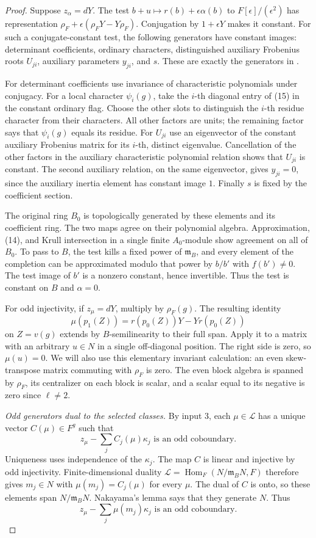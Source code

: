 \begin{proof}
Suppose $z_\alpha=dY$.  The test
$b+u\mapsto r(b)+\epsilon\alpha(b)$ to $F[\epsilon]/(\epsilon^2)$
has representation
$\rho_F+\epsilon(\rho_FY-Y\rho_F)$.
Conjugation by $1+\epsilon Y$ makes it constant.
For such a conjugate-constant test, the following generators
have constant images: determinant coefficients, ordinary
characters, distinguished auxiliary Frobenius roots $U_{ji}$,
auxiliary parameters $y_{ji}$, and $s$.
These are exactly the generators in .

For determinant coefficients use invariance of characteristic
polynomials under conjugacy.
For a local character $\psi_i(g)$, take the $i$-th diagonal
entry of (15) in the constant ordinary flag.
Choose the other slots to distinguish the $i$-th residue
character from their characters.  All other factors are units;
the remaining factor says that $\psi_i(g)$ equals its residue.
For $U_{ji}$ use an eigenvector of the constant auxiliary
Frobenius matrix for its $i$-th, distinct eigenvalue.
Cancellation of the other factors in the auxiliary
characteristic polynomial relation shows that $U_{ji}$ is
constant.  The second auxiliary relation, on the same
eigenvector, gives $y_{ji}=0$, since the auxiliary inertia
element has constant image $1$.
Finally $s$ is fixed by the coefficient section.

The original ring $B_0$ is topologically generated by these
elements and its coefficient ring.  The two maps agree on
their polynomial algebra.  Approximation, (14), and Krull
intersection in a single finite $A_0$-module show agreement on
all of $B_0$.
To pass to $B$, the test kills a fixed power of
$\mathfrak m_B$, and every element of the completion can be
approximated modulo that power by $b/b'$ with $f(b')\ne0$.
The test image of $b'$ is a nonzero constant, hence invertible.
Thus the test is constant on $B$ and $\alpha=0$.

For odd injectivity, if $z_\mu=dY$, multiply by $\rho_F(g)$.
The resulting identity
\[
 \mu(p_1(Z))=r(p_0(Z))Y-Yr(p_0(Z))
\]
on $Z=v(g)$ extends by $B$-semilinearity to their full span.
Apply it to a matrix with an arbitrary $u\in N$ in a single
off-diagonal position.  The right side is zero, so $\mu(u)=0$.
We will also use this elementary invariant calculation:
an even skew-transpose matrix commuting with $\rho_F$ is zero.
The even block algebra is spanned by $\rho_F$, its centralizer
on each block is scalar, and a scalar equal to its negative
is zero since $\ell\ne2$.

\emph{Odd generators dual to the selected classes.}
By input 3, each $\mu\in\mathcal L$ has a unique vector
$C(\mu)\in F^g$ such that
\[
               z_\mu-\sum_j C_j(\mu)\kappa_j
                        \text{ is an odd coboundary}.          \tag{17}
\]
Uniqueness uses independence of the $\kappa_j$.
The map $C$ is linear and injective by odd injectivity.
Finite-dimensional duality
$\mathcal L=\operatorname{Hom}_F(N/\mathfrak m_BN,F)$ therefore
gives $m_j\in N$ with $\mu(m_j)=C_j(\mu)$ for every $\mu$.
The dual of $C$ is onto, so these elements span
$N/\mathfrak m_BN$.  Nakayama's lemma says that they generate $N$.
Thus
\[
                 z_\mu-\sum_j\mu(m_j)\kappa_j
                         \text{ is an odd coboundary}.         \tag{18}
\]


\end{proof}
